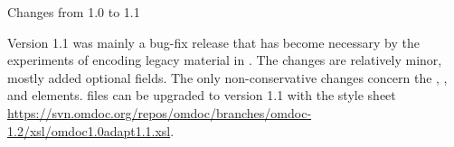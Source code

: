 
\begin{tsection}[id=changes1.1]{Changes from 1.0 to 1.1}
  
  Version 1.1 was mainly a bug-fix release that has become necessary by the experiments of
  encoding legacy material in {\omdoc}. The changes are relatively minor, mostly added
  optional fields. The only non-conservative changes concern the {},
  {}, {} and {} elements.
  {\omdoc} files can be upgraded to version 1.1 with the {\xslt} style sheet
  \url{https://svn.omdoc.org/repos/omdoc/branches/omdoc-1.2/xsl/omdoc1.0adapt1.1.xsl}.


\end{tsection}
